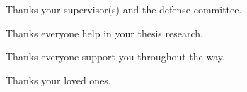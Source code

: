 Thanks your supervisor(s) and the defense committee. 

Thanks everyone help in your thesis research.

Thanks everyone support you throughout the way.

Thanks your loved ones.
